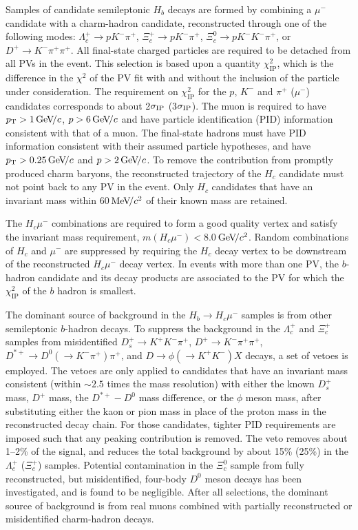 \documentclass[12pt,a4paper]{article}
\def\Pmu         {\ensuremath{\upmu}\xspace}
\def\Ppi         {\ensuremath{\uppi}\xspace}
\def\PXi         {\ensuremath{\Xi}\xspace}
\def\PLambda     {\ensuremath{\Lambda}\xspace}
\def\PD      {\ensuremath{\mathrm{D}}\xspace}
\def\PK      {\ensuremath{\mathrm{K}}\xspace}
\def\Pc      {\ensuremath{\mathrm{c}}\xspace}
\def\Ps      {\ensuremath{\mathrm{s}}\xspace}
\def\Pmu         {\ensuremath{\mu}\xspace}
\def\Ppi         {\ensuremath{\pi}\xspace}
\def\PD      {\ensuremath{D}\xspace}
\def\PK      {\ensuremath{K}\xspace}
\def\Pc      {\ensuremath{c}\xspace}
\def\Ps      {\ensuremath{s}\xspace}
\def\mun        {{\ensuremath{\Pmu^-}}\xspace} \def\mupm       {{\ensuremath{\Pmu^\pm}}\xspace}
\def\squark    {{\ensuremath{\Ps}}\xspace}
\def\cquark    {{\ensuremath{\Pc}}\xspace}
\def\pion   {{\ensuremath{\Ppi}}\xspace}
\def\pip    {{\ensuremath{\pion^+}}\xspace}
\def\kaon    {{\ensuremath{\PK}}\xspace}
\def\Kp      {{\ensuremath{\kaon^+}}\xspace}
\def\Km      {{\ensuremath{\kaon^-}}\xspace}
\def\D       {{\ensuremath{\PD}}\xspace}
\def\Dz      {{\ensuremath{\D^0}}\xspace}
\def\Dp      {{\ensuremath{\D^+}}\xspace}
\def\Dstarp  {{\ensuremath{\D^{*+}}}\xspace}
\def\Ds      {{\ensuremath{\D^+_\squark}}\xspace}
\def\Dsp     {{\ensuremath{\D^+_\squark}}\xspace}
\def\Lz          {{\ensuremath{\PLambda}}\xspace}
\def\Xires       {{\ensuremath{\PXi}}\xspace}
\def\Lc          {{\ensuremath{\Lz^+_\cquark}}\xspace}
\def\Xicz        {{\ensuremath{\Xires^0_\cquark}}\xspace}
\def\Xicp        {{\ensuremath{\Xires^+_\cquark}}\xspace}
\def\to                 {\ensuremath{\rightarrow}\xspace}
\newcommand{\aunit}[1]{\ensuremath{\text{\,#1}}}
\newcommand{\gevc}{\ensuremath{\aunit{Ge\kern -0.1em V\!/}c}\xspace}
\newcommand{\mevcc}{\ensuremath{\aunit{Me\kern -0.1em V\!/}c^2}\xspace}
\newcommand{\gevcc}{\ensuremath{\aunit{Ge\kern -0.1em V\!/}c^2}\xspace}
\newcommand{\chisq}{\ensuremath{\chi^2}\xspace}
\newcommand{\chisqip}{\ensuremath{\chi^2_{\text{IP}}}\xspace}
\def\pt         {\ensuremath{p_{\mathrm{T}}}\xspace}
\begin{document}
Samples of candidate semileptonic $H_b$ decays are formed by combining a $\mun$ candidate with a
charm-hadron candidate, reconstructed through one of the following modes:
$\Lc\to p\Km\pip$, $\Xicp\to p\Km\pip$, $\Xicz\to p\Km\Km\pip$, or $\Dp\to\Km\pip\pip$.
All final-state charged particles are required to be detached from all PVs in the event. This selection is
based upon a quantity $\chisqip$, which is the difference in the $\chisq$ of the PV fit with and 
without the inclusion of the particle under consideration. The requirement on $\chisqip$ 
for the $p$, $\Km$ and $\pip$ ($\mun$) candidates corresponds to about 2$\sigma_{\rm IP}$ (3$\sigma_{\rm IP}$).
The muon is required to have $\pt>1\gevc$, $p>6\gevc$ and have particle identification (PID) information  
consistent with that of a muon. The final-state hadrons must have PID information consistent with their assumed particle hypotheses, and have
$\pt>0.25\gevc$ and $p>2\gevc$.  To remove the contribution from promptly produced charm
baryons, the reconstructed trajectory of the $H_c$ candidate must not point back to any PV in the event.
Only $H_c$ candidates that have an invariant mass within 60\mevcc of their known mass are retained. 

The $H_c\mun$ combinations are required to form a good quality vertex and satisfy the invariant mass requirement, $m(H_c\mun)<8.0$\gevcc. 
Random combinations of $H_c$ and $\mun$ are suppressed by requiring the $H_c$ decay vertex to be downstream of the reconstructed $H_c\mun$ decay vertex.
In events with more than one PV, the $b$-hadron candidate and its decay products are associated to the PV for which 
the $\chisqip$ of the $b$ hadron is smallest.

The dominant source of background in the $H_b\to H_c\mun$ samples is from other semileptonic $b$-hadron decays.
To suppress the background in the $\Lc$ and $\Xicp$ samples from misidentified $\Ds\to\Kp\Km\pip$, $\Dp\to\Km\pip\pip$, $\Dstarp\to\Dz(\to\Km\pip)\pip$, and 
$D\to\phi(\to\Kp\Km)X$ decays, a set of vetoes is employed. 
The vetoes are only applied to candidates that have an invariant mass consistent (within $\sim2.5$ times the mass resolution) with 
either the known $\Dsp$ mass, $\Dp$ mass, the $\Dstarp-\Dz$ mass difference, or the $\phi$ meson mass, after substituting either the kaon or pion mass 
in place of the proton mass in the reconstructed decay chain. For those candidates, tighter PID requirements are imposed such that any
peaking contribution is removed. The veto removes about 1--2\% of the signal, and reduces the total background by
about 15\% (25\%) in the $\Lc$ ($\Xicp$) samples.
Potential contamination in the $\Xicz$ sample from fully reconstructed, but misidentified, four-body $\Dz$ meson decays 
has been investigated, and is found to be negligible. After all selections, the dominant source of background is from
real muons combined with partially reconstructed or misidentified charm-hadron decays.
\end{document}
